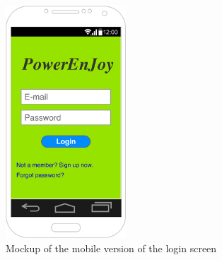 \begin{figure}[H]
\begin{center}
		\includegraphics[width=0.4\textwidth]{./specific_requirements/features/diagrams/mobile_login.png}
		\caption{Mockup of the mobile version of the login screen}
\end{center}
\end{figure}